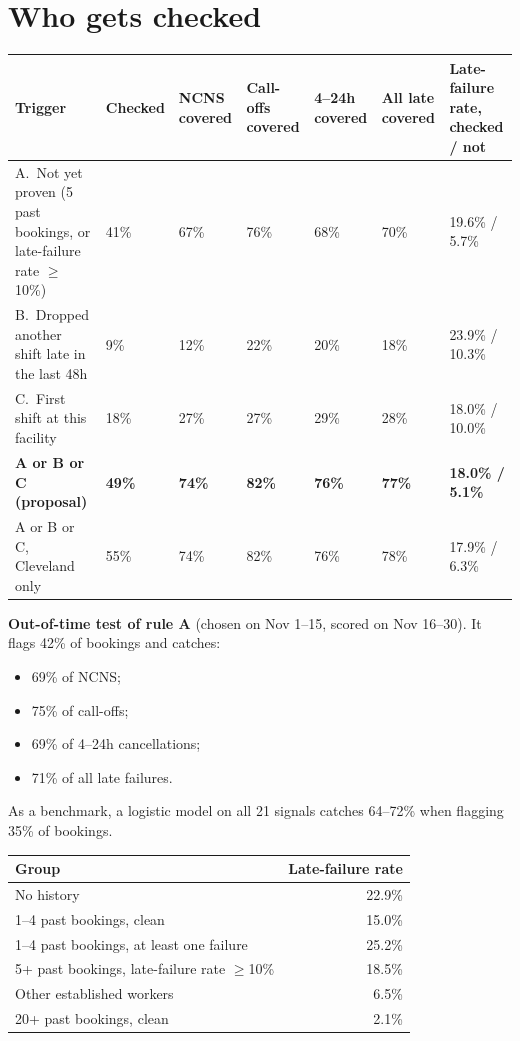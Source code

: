 \section{Who gets checked}
\begin{center}\small
{}
\begin{tabularx}{\textwidth}{@{}LR{1.1cm}R{1.2cm}R{1.2cm}R{1.2cm}R{1.2cm}R{2.0cm}@{}}
\toprule
Trigger & Checked & NCNS covered & Call-offs covered & 4--24h covered & All late covered & Late-failure rate, checked / not \\
\midrule
A.\ Not yet proven (\lthan{}5 past bookings, or late-failure rate $\ge$10\%) & 41\% & 67\% & 76\% & 68\% & 70\% & 19.6\% / 5.7\% \\
B.\ Dropped another shift late in the last 48h & 9\% & 12\% & 22\% & 20\% & 18\% & 23.9\% / 10.3\% \\
C.\ First shift at this facility & 18\% & 27\% & 27\% & 29\% & 28\% & 18.0\% / 10.0\% \\
\textbf{A or B or C (proposal)} & \textbf{49\%} & \textbf{74\%} & \textbf{82\%} & \textbf{76\%} & \textbf{77\%} &
\textbf{18.0\% / 5.1\%} \\
A or B or C, Cleveland only & 55\% & 74\% & 82\% & 76\% & 78\% & 17.9\% / 6.3\% \\
\bottomrule
\end{tabularx}
\end{center}

\textbf{Out-of-time test of rule A} (chosen on Nov 1--15, scored on Nov 16--30). It flags 42\% of bookings and catches:
\begin{itemize}
  \item 69\% of NCNS;
  \item 75\% of call-offs;
  \item 69\% of 4--24h cancellations;
  \item 71\% of all late failures.
\end{itemize}
As a benchmark, a logistic model on all 21 signals catches 64--72\% when flagging 35\% of bookings.

\begin{center}\small
{}
\begin{tabular}{@{}lr@{}}
\toprule
Group & Late-failure rate \\
\midrule
No history & 22.9\% \\
1--4 past bookings, clean & 15.0\% \\
1--4 past bookings, at least one failure & 25.2\% \\
5+ past bookings, late-failure rate $\ge$10\% & 18.5\% \\
Other established workers & 6.5\% \\
20+ past bookings, clean & 2.1\% \\
\bottomrule
\end{tabular}
\end{center}

